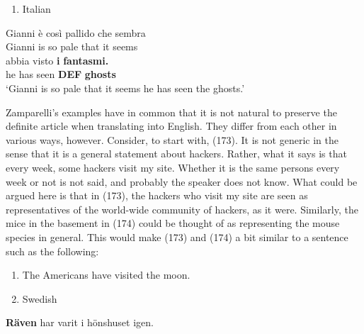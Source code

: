 \begin{enumerate} %
\item 
\label{bkm:Ref172696628}Italian

\end{enumerate} %
\ea\label{}
\gll Gianni  è  così  pallido  che  sembra\\


Gianni  is  so  pale  that  it seems\\ %


\ea\label{}
\gll abbia  visto  \textbf{i} \textbf{fantasmi.}   \\


he has  seen  \textbf{DEF} \textbf{ghosts}   \\ %


‘Gianni is so pale that it seems he has seen the ghosts.’
\z


Zamparelli’s examples have in common that it is not natural to preserve the definite article when translating into English. They differ from each other in various ways, however. Consider, to start with, (173). It is not generic in the sense that it is a general statement about hackers. Rather, what it says is that every week, some hackers visit my site. Whether it is the same persons every week or not is not said, and probably the speaker does not know. What could be argued here is that in (173), the hackers who visit my site are seen as representatives of the world-wide community of hackers, as it were. Similarly, the mice in the basement in (174) could be thought of as representing the mouse species in general. This would make (173) and (174) a bit similar to a sentence such as the following: 

\begin{enumerate} %
\item 
\label{bkm:Ref69031158}The Americans have visited the moon.

\item 
\label{bkm:Ref77501116}Swedish

\end{enumerate} %
\ea\label{}
\gll \textbf{Räven} har  varit  i  hönshuset  igen.\\


